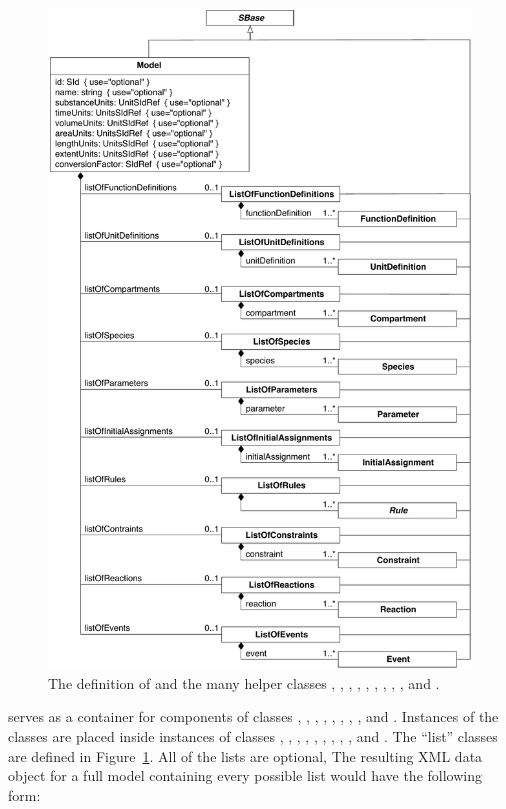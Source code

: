 \begin{figure}[htbp]
  \centering
  \includegraphics[scale=0.75]{figs/model-uml}
  \caption{The definition of \Model and the many helper
      classes \ListOfFunctionDefinitions, \ListOfUnitDefinitions,
      \ListOfCompartments, \ListOfSpecies, \ListOfParameters,
      \ListOfInitialAssignments, \ListOfRules, \ListOfConstraints,
      \ListOfReactions, and \ListOfEvents.}
  \label{fig:model}
\end{figure}

\Model serves as a container for components of classes
\FunctionDefinition, \UnitDefinition, \Compartment, \Species, \Parameter,
\InitialAssignment, \Rule, \Constraint, \Reaction and \Event.
Instances of the classes are placed inside instances of classes
\ListOfFunctionDefinitions, \ListOfUnitDefinitions,
\ListOfCompartments, \ListOfSpecies, \ListOfParameters, \ListOfInitialAssignments,
\ListOfRules, \ListOfConstraints, \ListOfReactions, and
\ListOfEvents.  The ``list'' classes are defined in
Figure~\ref{fig:model}.  All of the lists are optional,   The
resulting XML data object for a full model containing every
possible list would have the following form:

